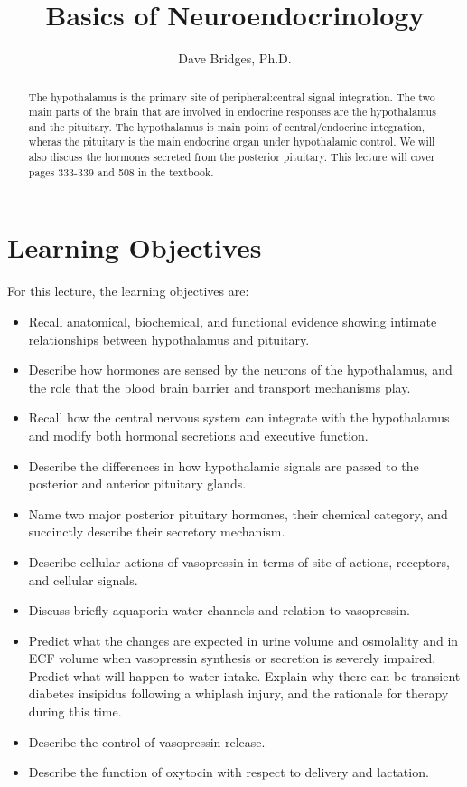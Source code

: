 \documentclass{tufte-handout}
\title{Basics of Neuroendocrinology}
\author{Dave Bridges, Ph.D.}
\begin{document}
\maketitle%

\begin{abstract}
\noindent The hypothalamus is the primary site of peripheral:central signal integration.  The two main parts of the brain that are involved in endocrine responses are the hypothalamus and the pituitary.  The hypothalamus is main point of central/endocrine integration, wheras the pituitary is the main endocrine organ under hypothalamic control.  We will also discuss the hormones secreted from the posterior pituitary.  This lecture will cover pages 333-339 and 508 in the textbook\cite{Widmaier2013}.
\end{abstract}

\tableofcontents

\pagebreak

\section{Learning Objectives}
For this lecture, the learning objectives are:
\begin{itemize}
\item Recall anatomical, biochemical, and functional evidence showing intimate relationships between hypothalamus and pituitary.
\item Describe how hormones are sensed by the neurons of the hypothalamus, and the role that the blood brain barrier and transport mechanisms play.
\item Recall how the central nervous system can integrate with the hypothalamus and modify both hormonal secretions and executive function.
\item Describe the differences in how hypothalamic signals are passed to the posterior and anterior pituitary glands.
\item Name two major posterior pituitary hormones, their chemical category, and succinctly describe their secretory mechanism.
\item Describe cellular actions of vasopressin in terms of site of actions, receptors, and cellular signals.
\item Discuss briefly aquaporin water channels and relation to vasopressin. 
\item Predict what the changes are expected in urine volume and osmolality and in ECF volume when vasopressin synthesis or secretion is severely impaired. Predict what will happen to water intake. Explain why there can be transient diabetes insipidus following a whiplash injury, and the rationale for therapy during this time. 
\item Describe the control of vasopressin release.
\item Describe the function of oxytocin with respect to delivery and lactation.


\end{itemize}
\end{document}
